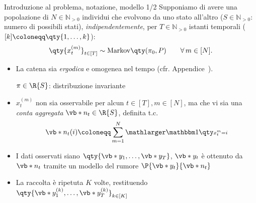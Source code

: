 \documentclass[10pt,xcolor={table,dvipsnames}]{beamer} 		%
\theoremstyle{plain}					%
\theoremstyle{definition}
\theoremstyle{remark}
\begin{document}
	\begin{frame}{Introduzione al problema, notazione, modello 1/2}%
		Supponiamo di avere una popolazione di $N\in\mathbb{N}_{>0}$ individui che evolvono da 
		uno stato all'altro {\smaller ($S\in\mathbb{N}_{>0}$: numero di possibili stati)}, 
		\emph{indipendentemente}, per $T\in\mathbb{N}_{>0}$ istanti temporali 
		{\smaller ($[k]\coloneqq\qty{1,\dots,k}$)}:
		\[
			\qty{x_{t}^{(m)}}_{t\in[T]}\sim\mathrm{Markov}\qty(\pi_0,P)\qquad\forall\,m\in[N].
		\]
		
		\begin{itemize}
			\item<2-> La catena sia \emph{ergodica} e omogenea nel tempo
			(cfr. Appendice~\hyperlink{frame:catena_ergodica:appendice}{\faHandPointRight}).

			$\pi\in\R{S}$: distribuzione invariante 
			\item<3-> $x_t^{(m)}$ non sia osservabile per alcun $t\in[T], m\in[N]$, 
			ma che vi sia una \emph{conta aggregata} $\vb*{n}_t\in\R{S}$, definita t.c.
			\vspace*{-0.5\baselineskip}
			\[
				\vb*{n}_t(i)\coloneqq\sum_{m=1}^N\indicator
			\]
			\vspace*{-0.9\baselineskip}
			\item<4-> I dati osservati siano $\qty{\vb*{y}_1,\dots,\vb*{y}_T}$, 
			$\vb*{y}_t$ è ottenuto 
			da $\vb*{n}_t$ tramite un modello del rumore $\P{\vb*{y}_t}{\vb*{n}_t}$
			\item<5-> La raccolta è ripetuta $K$ volte, restituendo 
			$\qty{\vb*{y}_1^{(k)},\dots,\vb*{y}_T^{(k)}}_{k\in[K]}$
		\end{itemize}
	\end{frame}
\end{document}
